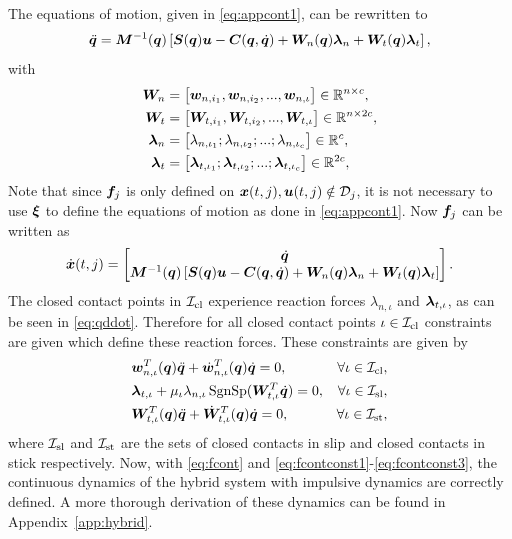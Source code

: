 \documentclass[../DC2017114Bouma.tex]{subfiles}
\begin{document}
The equations of motion, given in \eqref{eq:appcont1}, can be rewritten to
\begin{align}
\ddot{{\boldsymbol{q}}} = {\boldsymbol{M}}^{-1}({\boldsymbol{q}})\left[ {\boldsymbol{S}}({\boldsymbol{q}}){\boldsymbol{u}} - {\boldsymbol{C}}({\boldsymbol{q}},\dot{{\boldsymbol{q}}}) + {\boldsymbol{W}}_{n}({\boldsymbol{q}})\boldsymbol{\lambda}_{n} + {\boldsymbol{W}}_{t}({\boldsymbol{q}})\boldsymbol{\lambda}_{t}\right],\label{eq:qddot}
\end{align}
with
\begin{align}
{\boldsymbol{W}}_n &= \begin{bmatrix}
{\boldsymbol{w}}_{n,i_1},{\boldsymbol{w}}_{n,i_2},...,{\boldsymbol{w}}_{n,\iota}
\end{bmatrix}\in\mathbb{R}^{n\times c},\\
{\boldsymbol{W}}_t &= \begin{bmatrix}
{\boldsymbol{W}}_{t,i_1},{\boldsymbol{W}}_{t,i_2},...,{\boldsymbol{W}}_{t,\iota} 
\end{bmatrix}\in\mathbb{R}^{n\times 2c},\\
\boldsymbol{\lambda}_n &= \begin{bmatrix}
\lambda_{n,\iota_1};\lambda_{n,\iota_2};...;\lambda_{n,\iota_c} 
\end{bmatrix}\in\mathbb{R}^{c},\\
\boldsymbol{\lambda}_t &= \begin{bmatrix}
\boldsymbol{\lambda}_{t,\iota_1};\boldsymbol{\lambda}_{t,\iota_2};...;\boldsymbol{\lambda}_{t,\iota_c} 
\end{bmatrix}\in\mathbb{R}^{2c},
\end{align}
Note that since ${\boldsymbol{f}}_j$ is only defined on ${\boldsymbol{x}}(t,j),{\boldsymbol{u}}(t,j)\notin \mathcal{D}_j$, it is not necessary to use $\boldsymbol{\xi}$ to define the equations of motion as done in \eqref{eq:appcont1}. Now ${\boldsymbol{f}}_j$ can be written as
\begin{align}
\dot{{\boldsymbol{x}}}(t,j) =\begin{bmatrix}
\dot{{\boldsymbol{q}}}\\ {\boldsymbol{M}}^{-1}({\boldsymbol{q}})\left[ {\boldsymbol{S}}({\boldsymbol{q}}){\boldsymbol{u}} - {\boldsymbol{C}}({\boldsymbol{q}},\dot{{\boldsymbol{q}}}) + {\boldsymbol{W}}_{n}({\boldsymbol{q}})\boldsymbol{\lambda}_{n} + {\boldsymbol{W}}_{t}({\boldsymbol{q}})\boldsymbol{\lambda}_{t}\right]
\end{bmatrix}.\label{eq:fcont}
\end{align}
The closed contact points in $\mathcal{I}_{\text{cl}}$ experience reaction forces $\lambda_{n,\iota}$ and $\boldsymbol{\lambda}_{t,\iota}$, as can be seen in \eqref{eq:qddot}. Therefore for all closed contact points $\iota\in\mathcal{I}_{\text{cl}}$ constraints are given which define these reaction forces. These constraints are given by
\begin{align}
&{\boldsymbol{w}}^T_{n,\iota}({\boldsymbol{q}})\ddot{{\boldsymbol{q}}} + \dot{{\boldsymbol{w}}}^T_{n,\iota}({\boldsymbol{q}})\dot{{\boldsymbol{q}}} = 0, &\forall \iota\in\mathcal{I}_{\text{cl}},\label{eq:fcontconst1}\\
&\boldsymbol{\lambda}_{t,\iota} + \mu_{\iota}\lambda_{n,\iota}\operatorname{\text{SgnSp}}({\boldsymbol{W}}_{t,\iota}^T\dot{{\boldsymbol{q}}}) = 0, &\forall \iota\in\mathcal{I}_{\text{sl}},\label{eq:fcontconst2}\\
&{\boldsymbol{W}}^T_{t,\iota}({\boldsymbol{q}})\ddot{{\boldsymbol{q}}} + \dot{{\boldsymbol{W}}}^T_{t,\iota}({\boldsymbol{q}})\dot{{\boldsymbol{q}}} = 0, &\forall \iota\in\mathcal{I}_{\text{st}},\label{eq:fcontconst3}
\end{align}
where $\mathcal{I}_{\text{sl}}$ and $\mathcal{I}_{\text{st}}$ are the sets of closed contacts in slip and closed contacts in stick respectively. Now, with \eqref{eq:fcont} and \eqref{eq:fcontconst1}-\eqref{eq:fcontconst3}, the continuous dynamics of the hybrid system with impulsive dynamics are correctly defined. A more thorough derivation of these dynamics can be found in Appendix~\ref{app:hybrid}.
\end{document}
